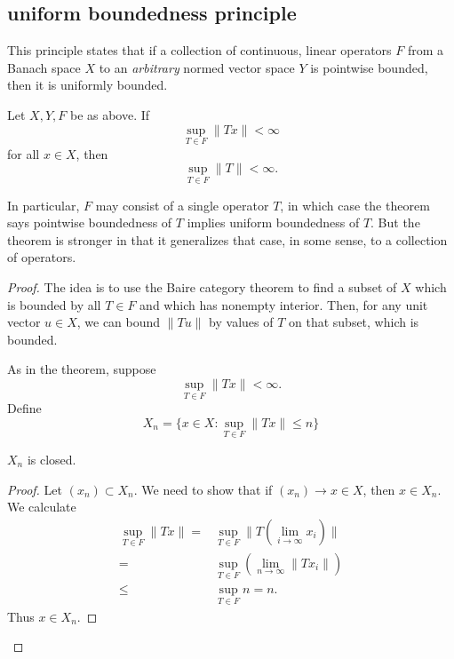 \documentclass[12pt]{article}
\begin{document}
\begin{refsection}

\subsection{uniform boundedness principle} %

This principle states that if a collection of continuous, linear operators $F$ from a Banach space $X$ to an \emph{arbitrary} normed vector space $Y$ is pointwise bounded, then it is uniformly bounded.

\begin{theorem}
\label{thm_ubp}
	Let $X, Y, F$ be as above. If 
	\begin{equation*}
		\sup_{T\in F} \|Tx\| < \infty
	\end{equation*}
	for all $x\in X$, then 
	\begin{equation*}
		\sup_{T\in F} \|T\| < \infty.
	\end{equation*}
\end{theorem}

\begin{remark}
	In particular, $F$ may consist of a single operator $T$, in which case the theorem says pointwise boundedness of $T$ implies uniform boundedness of $T$. But the theorem is stronger in that it generalizes that case, in some sense, to a collection of operators.
\end{remark}

\begin{proof}
	The idea is to use the Baire category theorem to find a subset of $X$ which is bounded by all $T\in F$ and which has nonempty interior. Then, for any unit vector $u\in X$, we can bound $\|Tu\|$ by values of $T$ on that subset, which is bounded. 

	As in the theorem, suppose 
	\begin{equation*}
		\sup_{T\in F}\|Tx\| < \infty.
	\end{equation*}
	Define 
	\begin{equation*}
		X_n = \{ x\in X : \sup_{T\in F} \|Tx\| \leq n \}
	\end{equation*}
	
	\begin{proposition}
		$X_n$ is closed.
	\end{proposition}
	\begin{proof}
		Let $(x_n)\subset X_n$. We need to show that if $(x_n)\to x\in X$, then $x\in X_n$. We calculate 
		\begin{align*}
			\sup_{T\in F} \|Tx\| =& \sup_{T\in F}\|T(\lim_{i\to\infty}x_i)\| \\
			=& \sup_{T\in F} (\lim_{n\to\infty} \|Tx_i\|) \\
			\leq& \sup_{T\in F} n = n.
		\end{align*}
		Thus $x\in X_n$.
	\end{proof}


\end{proof}
\end{refsection}
\end{document}
